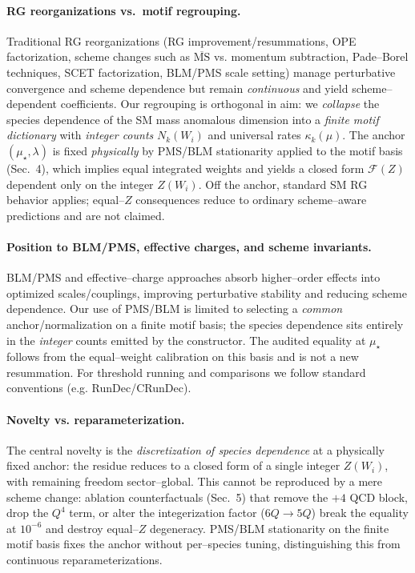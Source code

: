 \documentclass[epjc3]{svjour3}
\begin{document}
\paragraph{RG reorganizations vs.\ motif regrouping.}
Traditional RG reorganizations (RG improvement/resummations, OPE factorization, scheme changes such as $\overline{\mathrm{MS}}$ vs. momentum subtraction, Pade--Borel techniques, SCET factorization, BLM/PMS scale setting) manage perturbative convergence and scheme dependence but remain \emph{continuous} and yield scheme--dependent coefficients. Our regrouping is orthogonal in aim: we \emph{collapse} the species dependence of the SM mass anomalous dimension into a \emph{finite motif dictionary} with \emph{integer counts} $N_k(W_i)$ and universal rates $\kappa_k(\mu)$. The anchor $(\mu_\star,\lambda)$ is fixed \emph{physically} by PMS/BLM stationarity applied to the motif basis (Sec.~4), which implies equal integrated weights and yields a closed form $\mathcal F(Z)$ dependent only on the integer $Z(W_i)$. Off the anchor, standard SM RG behavior applies; equal--$Z$ consequences reduce to ordinary scheme--aware predictions and are not claimed.

\paragraph{Position to BLM/PMS, effective charges, and scheme invariants.}
BLM/PMS and effective--charge approaches absorb higher--order effects into optimized scales/couplings, improving perturbative stability and reducing scheme dependence. Our use of PMS/BLM is limited to selecting a \emph{common} anchor/normalization on a finite motif basis; the species dependence sits entirely in the \emph{integer} counts emitted by the constructor. The audited equality at $\mu_\star$ follows from the equal--weight calibration on this basis and is not a new resummation. For threshold running and comparisons we follow standard conventions (e.g. RunDec/CRunDec).

\paragraph{Novelty vs. reparameterization.}
The central novelty is the \emph{discretization of species dependence} at a physically fixed anchor: the residue reduces to a closed form of a single integer $Z(W_i)$, with remaining freedom sector--global. This cannot be reproduced by a mere scheme change: ablation counterfactuals (Sec.~5) that remove the $+4$ QCD block, drop the $Q^4$ term, or alter the integerization factor ($6Q\to5Q$) break the equality at $10^{-6}$ and destroy equal--$Z$ degeneracy. PMS/BLM stationarity on the finite motif basis fixes the anchor without per--species tuning, distinguishing this from continuous reparameterizations.
\end{document}
